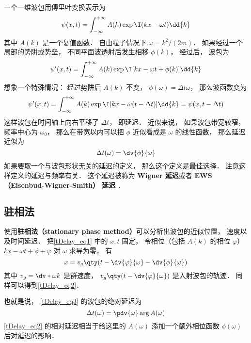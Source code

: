 
\begin{issues}
\issueDraft
\end{issues}

一个一维波包用傅里叶变换表示为
\begin{equation}\label{tDelay_eq3}
\psi(x, t) = \int_{-\infty}^{+\infty} A(k) \exp \I( kx - \omega t) \dd{k}
\end{equation}
其中 $A(k)$ 是一个复值函数． 自由粒子情况下 $\omega = k^2/(2m)$． 如果经过一个局部的势阱或势垒， 不同平面波透射后发生相移 $\phi(k)$， 经过后， 波包为
\begin{equation}\label{tDelay_eq1}
\psi'(x, t) = \int_{-\infty}^{+\infty} A(k) \exp \I[kx - \omega t + \phi(k)] \dd{k}
\end{equation}
想象一个特殊情况： 经过势阱后 $A(k)$ 不变， $\phi(\omega) = \Delta t \omega$， 那么波函数变为
\begin{equation}
\psi'(x, t) = \int_{-\infty}^{+\infty} A(k) \exp \I[kx - \omega (t - \Delta t) ] \dd{k}
= \psi(x, t - \Delta t)
\end{equation}
这样波包在时间轴上向右平移了 $\Delta t$， 即延迟． 近似来说， 如果波包带宽较窄， 频率中心为 $\omega_0$， 那么在带宽以内可以把 $\phi$ 近似看成是 $\omega$ 的线性函数， 那么延迟近似为
\begin{equation}\label{tDelay_eq2}
\Delta t(\omega) = \dv{\phi}{\omega}
\end{equation}
如果要取一个与波包形状无关的延迟的定义， 那么这个定义是最佳选择． 注意这样定义的延迟与频率有关． 这个延迟被称为 \textbf{Wigner 延迟}或者 \textbf{EWS （Eisenbud-Wigner-Smith） 延迟} ．

\subsection{驻相法}
使用\textbf{驻相法（stationary phase method）}可以分析出波包的近似位置， 速度以及时间延迟． 把\autoref{tDelay_eq1} 中的 $x, t$ 固定， 令相位（包括 $A(k)$ 的相位 $\varphi$） $kx - \omega t + \phi + \varphi$ 对 $\omega$ 求导为零， 有
\begin{equation}
x = v_g \qty(t - \dv{\varphi}{\omega} - \dv{\phi}{\omega})
\end{equation}
其中 $v_g = \dv*{\omega}{k}$ 是群速度， $v_g \qty(t - \dv{\varphi}{\omega})$ 是入射波包的轨迹． 同样可以得到\autoref{tDelay_eq2}．

也就是说， \autoref{tDelay_eq3} 的波包的绝对延迟为
\begin{equation}\label{tDelay_eq4}
\Delta t(\omega) = \pdv{\omega}\arg A(\omega)
\end{equation}
\autoref{tDelay_eq2} 的相对延迟相当于给这里的 $A(\omega)$ 添加一个额外相位函数 $\phi(\omega)$ 后对延迟的影响．

